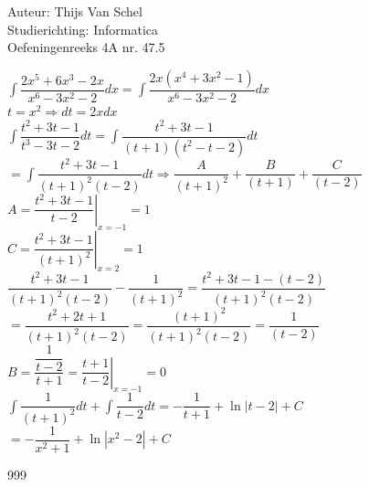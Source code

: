 \documentclass[a4paper]{article}
\newcommand{\dint}{\displaystyle\int}
\begin{document}
  
\noindent \large Auteur: Thijs Van Schel \\
\noindent \large Studierichting: Informatica\\
\noindent \large Oefeningenreeks 4A nr. 47.5\\

\medskip

\normalsize

$\dint \dfrac{2x^5+6x^3-2x}{x^6-3x^2-2}dx = \dint \dfrac{2x(x^4+3x^2-1)}{x^6-3x^2-2}dx$\\

$t=x^2 \Rightarrow dt = 2xdx$\\

$\dint \dfrac{t^2+3t-1}{t^3-3t-2}dt = \dint \dfrac{t^2+3t-1}{(t+1)(t^2-t-2)}dt$\\

$= \dint \dfrac{t^2+3t-1}{(t+1)^2(t-2)}dt \Rightarrow \dfrac{A}{(t+1)^2} + \dfrac{B}{(t+1)}+ \dfrac{C}{(t-2)}$\\

$A = \left . \dfrac{t^2+3t-1}{t-2} \right |_{x=-1}=1$\\

$C = \left . \dfrac{t^2+3t-1}{(t+1)^2} \right |_{x=2}=1$\\

$\dfrac{t^2+3t-1}{(t+1)^2(t-2)}-\dfrac{1}{(t+1)^2}= \dfrac{t^2+3t-1-(t-2)}{(t+1)^2(t-2)}$\\

$= \dfrac{t^2+2t+1}{(t+1)^2(t-2)}=\dfrac{(t+1)^2}{(t+1)^2(t-2)}=\dfrac{1}{(t-2)}$\\

$B = \dfrac{\dfrac{1}{t-2}}{t+1}=\left .\dfrac{t+1}{t-2}\right |_{x=-1}=0$\\

$\dint \dfrac{1}{(t+1)^2}dt + \dint \dfrac{1}{t-2}dt= -\dfrac{1}{t+1}+\ln|t-2|+C$\\

$=-\dfrac{1}{x^2+1}+\ln|x^2-2|+C$

\begin{thebibliography}{999}
\end{thebibliography}
\end{document}
